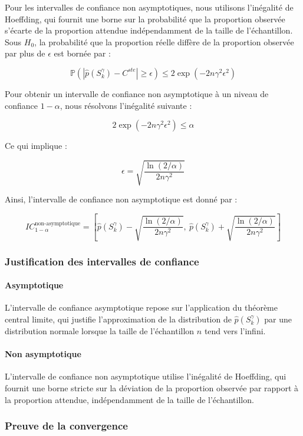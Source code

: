 \documentclass[12pt,a4paper]{article}
\theoremstyle{definition}
\theoremstyle{remark}
\begin{document}
Pour les intervalles de confiance non asymptotiques, nous utilisons l'inégalité de Hoeffding, qui fournit une borne sur la probabilité que la proportion observée s'écarte de la proportion attendue indépendamment de la taille de l'échantillon. Sous $H_0$, la probabilité que la proportion réelle diffère de la proportion observée par plus de $\epsilon$ est bornée par :

$$
\mathbb{P}\left( \left| \hat{p}(S_k^{\gamma}) - C^{ste} \right| \geq \epsilon \right) \leq 2 \exp(-2 n \gamma^2 \epsilon^2)
$$

Pour obtenir un intervalle de confiance non asymptotique à un niveau de confiance $1 - \alpha$, nous résolvons l'inégalité suivante :

$$
2 \exp(-2 n \gamma^2 \epsilon^2) \leq \alpha
$$

Ce qui implique :

$$
\epsilon = \sqrt{\frac{\ln(2/\alpha)}{2 n \gamma^2}}
$$

Ainsi, l'intervalle de confiance non asymptotique est donné par :

$$
IC_{1 - \alpha}^{\text{non-asymptotique}} = \left[ \hat{p}(S_k^{\gamma}) - \sqrt{\frac{\ln(2/\alpha)}{2 n \gamma^2}}, \ \hat{p}(S_k^{\gamma}) + \sqrt{\frac{\ln(2/\alpha)}{2 n \gamma^2}} \right]
$$

\subsubsection{Justification des intervalles de confiance}

\paragraph{Asymptotique} L'intervalle de confiance asymptotique repose sur l'application du théorème central limite, qui justifie l'approximation de la distribution de $\hat{p}(S_k^{\gamma})$ par une distribution normale lorsque la taille de l'échantillon $n$ tend vers l'infini.

\paragraph{Non asymptotique} L'intervalle de confiance non asymptotique utilise l'inégalité de Hoeffding, qui fournit une borne stricte sur la déviation de la proportion observée par rapport à la proportion attendue, indépendamment de la taille de l'échantillon.

\subsubsection{Preuve de la convergence}
\end{document}
